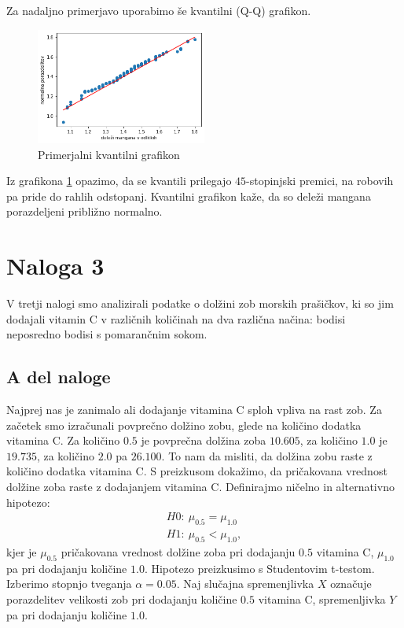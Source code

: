 \documentclass{article}
\begin{document}
Za nadaljno primerjavo uporabimo še kvantilni (Q-Q) grafikon. 
\begin{figure}[H]
    \begin{center}
        \includegraphics*[width=0.5\textwidth]{figure2C.png}
        \caption{Primerjalni kvantilni grafikon}
        \label{2C}
    \end{center}
\end{figure}

Iz grafikona \ref{2C} opazimo, da se kvantili prilegajo $45$-stopinjski premici, na robovih pa pride do 
rahlih odstopanj. Kvantilni grafikon kaže, da so deleži mangana porazdeljeni približno normalno.

\section{Naloga 3}
V tretji nalogi smo analizirali
podatke o dolžini zob morskih prašičkov, ki so jim
dodajali vitamin C v različnih količinah na dva različna načina: bodisi neposredno
bodisi s pomarančnim sokom.

\subsection{A del naloge}
Najprej nas je zanimalo ali dodajanje vitamina C sploh vpliva na rast zob. Za začetek smo izračunali
povprečno dolžino zobu, glede na količino dodatka vitamina C. Za količino $0.5$ je povprečna dolžina zoba
$10.605$, za količino $1.0$ je $19.735$, za količino $2.0$ pa $26.100$. To nam da misliti, da dolžina zobu raste 
z količino dodatka vitamina C.
S preizkusom dokažimo, da pričakovana vrednost dolžine zoba raste z dodajanjem vitamina C.
Definirajmo ničelno in alternativno
hipotezo:
\begin{align}
    H0: \ \mu_{0.5} = \mu_{1.0} \\
    H1: \ \mu_{0.5} < \mu_{1.0},
\end{align}
kjer je $\mu_{0.5}$ pričakovana vrednost dolžine zoba pri dodajanju $0.5$ vitamina C, 
$\mu_{1.0}$ pa pri dodajanju količine $1.0$.
Hipotezo preizkusimo s Studentovim t-testom. 
Izberimo stopnjo tveganja $\alpha=0.05$.
Naj slučajna spremenjlivka $X$ označuje porazdelitev velikosti zob pri dodajanju količine $0.5$ vitamina C,
spremenljivka $Y$ pa pri dodajanju količine $1.0$. 
\end{document}
